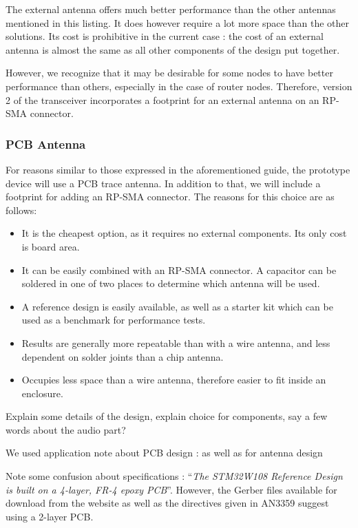 The external antenna offers much better performance than the other antennas
mentioned in this listing. It does however require a lot more space than the
other solutions. Its cost is prohibitive in the current case : the cost of an
external antenna is almost the same as all other components of the design put
together.

However, we recognize that it may be desirable for some nodes to have better
performance than others, especially in the case of router nodes. Therefore,
version 2 of the transceiver incorporates a footprint for an external antenna on
an RP-SMA connector.

\subsubsection{PCB Antenna}

For reasons similar to those expressed in the aforementioned guide, the
prototype device will use a PCB trace antenna. In addition to that, we will
include a footprint for adding an RP-SMA connector. The reasons for this choice
are as follows:

\begin{itemize}
  \item It is the cheapest option, as it requires no external components. Its
    only cost is board area.
  \item It can be easily combined with an RP-SMA connector. A capacitor can be
    soldered in one of two places to determine which antenna will be used. 
  \item A reference design is easily available, as well as a starter kit which
    can be used as a benchmark for performance tests.
  \item Results are generally more repeatable than with a wire antenna, and less
    dependent on solder joints than a chip antenna.
  \item Occupies less space than a wire antenna, therefore easier to fit inside
    an enclosure.
\end{itemize}

Explain some details of the design, explain choice for components, say a few
words about the audio part?

We used application note about PCB design : \cite{AN3206} as well as
\cite{AN3359} for antenna design

Note some confusion about specifications : ``\emph{The STM32W108 Reference
Design is built on a 4-layer, FR-4 epoxy PCB}''\citep{AN3206}. However, the
Gerber files available for download from the website as well as the directives
given in AN3359\cite{AN3359} suggest using a 2-layer PCB.

